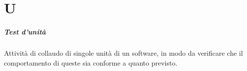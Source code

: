 \chapter{U}

\paragraph*{Test d'unità}
Attività di collaudo di singole unità di un software, in modo da verificare che il comportamento di queste sia conforme a quanto previsto.